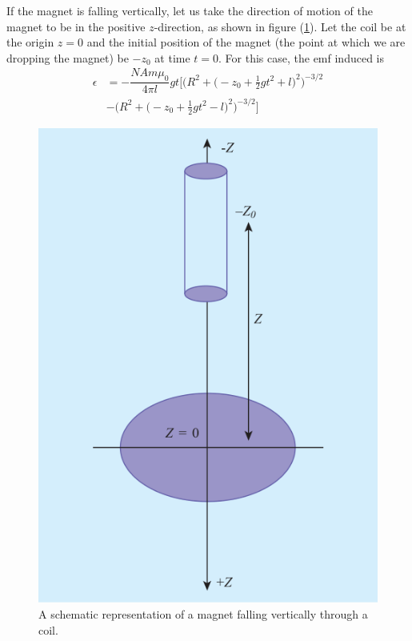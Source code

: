 \documentclass[%
 aip,
 amsmath,amssymb,
 reprint, floatfix%
]{revtex4-1}
\begin{document}
    \par
    If the magnet is falling vertically, let us take the direction of motion of the magnet to be in the positive $z$-direction, as shown in figure (\ref{fig:emdown}). Let the coil be at the origin $z = 0$ and the initial position of the magnet (the point at which we are dropping the magnet) be $-z_0$ at time $t = 0$. For this case, the emf induced is
    \begin{equation}
    \label{eq:finalem}
        \begin{split}
            \epsilon &= -\dfrac{NAm \mu_0}{4 \pi l} gt \Bigg[\Big(R^2 + \big(-z_0 + \frac{1}{2}gt^2 +l\big)^2 \Big)^{-3/2} \\
            & - \Big(R^2 + \big(-z_0 + \frac{1}{2}gt^2 -l\big)^2 \Big)^{-3/2} \Bigg]
        \end{split}
    \end{equation}
    \begin{figure}
        \centering
        \includegraphics[scale = 0.65]{Figures/emInd.png}
        \caption{A schematic representation of a magnet falling vertically through a coil.}
        \label{fig:emdown}
    \end{figure}
\end{document}
